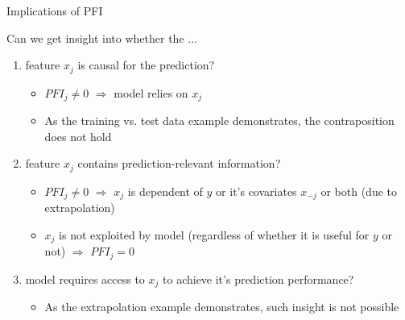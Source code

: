 \documentclass[11pt,compress,t,notes=noshow, aspectratio=169, xcolor=table]{beamer}
\begin{document}
\begin{frame}{Implications of PFI}

Can we get insight into whether the ...

\begin{enumerate}
    \item<1-> feature $x_j$ is causal for the prediction?
    \begin{itemize}
      \item $PFI_j \neq 0$ $\Rightarrow$ model relies on $x_j$
      \item As the training vs. test data example demonstrates, the contraposition does not hold
    \end{itemize}
    \item<2-> feature $x_j$ contains prediction-relevant information?
    \begin{itemize}
      \item $PFI_j \neq 0$  $\Rightarrow$ $x_{j}$ is dependent of $y$ or it's covariates $x_{-j}$ or both (due to extrapolation) 
      \item $x_{j}$ is not exploited by model (regardless of whether it is useful for $y$ or not) $\Rightarrow$ $PFI_j = 0$  %
    \end{itemize}
    \item<3-> model requires access to $x_j$ to achieve it's prediction performance?    
    \begin{itemize}
      \item As the extrapolation example demonstrates, such insight is not possible
\end{itemize}
\end{enumerate}
\end{frame}
\end{document}
